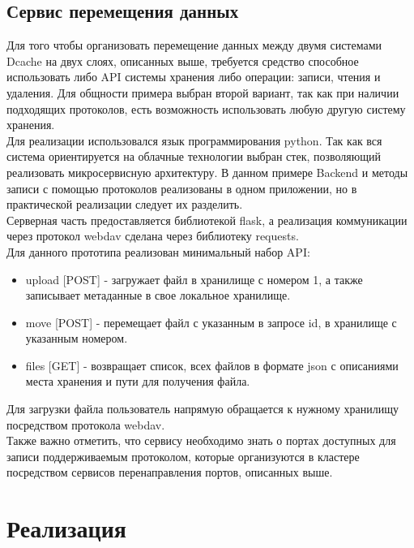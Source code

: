 \documentclass{article}
\begin{document}
\subsection{Сервис перемещения данных}
Для того чтобы организовать перемещение данных между двумя системами Dcache на двух слоях, описанных выше, требуется средство способное использовать либо API системы хранения либо операции: записи, чтения и удаления. Для общности примера выбран второй вариант, так как при наличии подходящих протоколов, есть возможность использовать любую другую систему хранения.\\
Для реализации использовался язык программирования python. Так как вся система ориентируется на облачные технологии выбран стек, позволяющий реализовать микросервисную архитектуру. В данном примере Backend и методы записи с помощью протоколов реализованы в одном приложении, но в практической реализации следует их разделить.\\
Серверная часть предоставляется библиотекой flask, а реализация коммуникации через протокол webdav сделана через библиотеку requests.\\
Для данного прототипа реализован минимальный набор API:
\begin{itemize}
    \item upload [POST] - загружает файл в хранилище с номером 1, а также записывает метаданные в свое локальное хранилище.
    \item move [POST] - перемещает файл с указанным в запросе id, в хранилище с указанным номером. 
    \item files [GET] - возвращает список, всех файлов в формате json с описаниями места хранения и пути для получения файла.
\end{itemize}
Для загрузки файла пользователь напрямую обращается к нужному хранилищу посредством протокола webdav. \\
Также важно отметить, что сервису необходимо знать о портах доступных для записи поддерживаемым протоколом, которые организуются в кластере посредством сервисов перенаправления портов, описанных выше. 

\section{Реализация}
\end{document}
